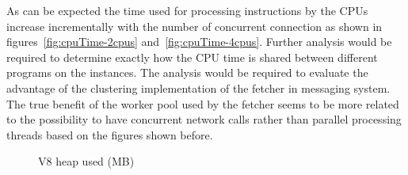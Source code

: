 \noindent
As can be expected the time used for processing instructions by the CPUs increase incrementally with the number of concurrent connection as shown in figures~\ref{fig:cpuTime-2cpus} and~\ref{fig:cpuTime-4cpus}. Further analysis would be required to determine exactly how the CPU time is shared between different programs on the instances. The analysis would be required to evaluate the advantage of the clustering implementation of the fetcher in messaging system. The true benefit of the worker pool used by the fetcher seems to be more related to the possibility to have concurrent network calls rather than parallel processing threads based on the figures shown before.
\\
\begin{figure}[h!]
	\centering
	 \hfill
	\caption{V8 heap used (MB)}
\end{figure}

